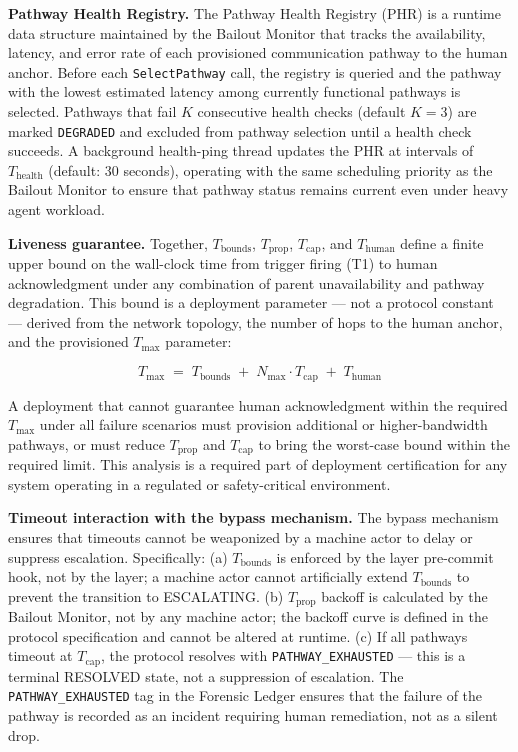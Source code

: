 \bigskip
\noindent\textbf{Pathway Health Registry.} The Pathway Health Registry (PHR) is a runtime data structure maintained by the Bailout Monitor that tracks the availability, latency, and error rate of each provisioned communication pathway to the human anchor. Before each \texttt{SelectPathway} call, the registry is queried and the pathway with the lowest estimated latency among currently functional pathways is selected. Pathways that fail $K$ consecutive health checks (default $K = 3$) are marked \texttt{DEGRADED} and excluded from pathway selection until a health check succeeds. A background health-ping thread updates the PHR at intervals of $T_{\text{health}}$ (default: 30 seconds), operating with the same scheduling priority as the Bailout Monitor to ensure that pathway status remains current even under heavy agent workload.

\bigskip
\noindent\textbf{Liveness guarantee.} Together, $T_{\text{bounds}}$, $T_{\text{prop}}$, $T_{\text{cap}}$, and $T_{\text{human}}$ define a finite upper bound on the wall-clock time from trigger firing (T1) to human acknowledgment under any combination of parent unavailability and pathway degradation. This bound is a deployment parameter — not a protocol constant — derived from the network topology, the number of hops to the human anchor, and the provisioned $T_{\max}$ parameter:

\begin{equation}
T_{\max} \;=\; T_{\text{bounds}} \;+\; N_{\max} \cdot T_{\text{cap}} \;+\; T_{\text{human}} \tag{T-max}
\end{equation}

A deployment that cannot guarantee human acknowledgment within the required $T_{\max}$ under all failure scenarios must provision additional or higher-bandwidth pathways, or must reduce $T_{\text{prop}}$ and $T_{\text{cap}}$ to bring the worst-case bound within the required limit. This analysis is a required part of deployment certification for any \bxthree{} system operating in a regulated or safety-critical environment.

\bigskip
\noindent\textbf{Timeout interaction with the bypass mechanism.} The bypass mechanism ensures that timeouts cannot be weaponized by a machine actor to delay or suppress escalation. Specifically: (a) $T_{\text{bounds}}$ is enforced by the \fact{} layer pre-commit hook, not by the \bounds{} layer; a machine actor cannot artificially extend $T_{\text{bounds}}$ to prevent the transition to ESCALATING. (b) $T_{\text{prop}}$ backoff is calculated by the Bailout Monitor, not by any machine actor; the backoff curve is defined in the protocol specification and cannot be altered at runtime. (c) If all pathways timeout at $T_{\text{cap}}$, the protocol resolves with \texttt{PATHWAY\_EXHAUSTED} — this is a terminal RESOLVED state, not a suppression of escalation. The \texttt{PATHWAY\_EXHAUSTED} tag in the Forensic Ledger ensures that the failure of the pathway is recorded as an incident requiring human remediation, not as a silent drop.
